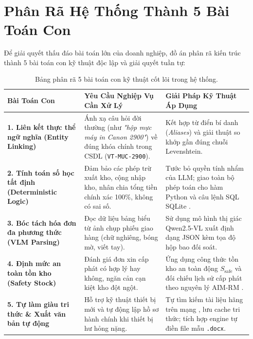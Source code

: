 \documentclass[11pt,a4paper]{article}
\begin{document}
\newpage

\section{Phân Rã Hệ Thống Thành 5 Bài Toán Con}

Để giải quyết thấu đáo bài toán lớn của doanh nghiệp, đồ án phân rã kiến trúc thành 5 bài toán con kỹ thuật độc lập và giải quyết tuần tự:

\begin{table}[H]
\centering
\small
\renewcommand{\arraystretch}{1.25}
\begin{tabularx}{\textwidth}{p{3.2cm} p{5.0cm} >{\raggedright\arraybackslash}X}
\toprule
\textbf{Bài Toán Con} & \textbf{Yêu Cầu Nghiệp Vụ Cần Xử Lý} & \textbf{Giải Pháp Kỹ Thuật Áp Dụng} \\
\midrule
\textbf{1. Liên kết thực thể ngữ nghĩa (Entity Linking)} & Ánh xạ câu hỏi đời thường (như \textit{"hộp mực máy in Canon 2900"}) về đúng khóa chính trong CSDL (\texttt{VT-MUC-2900}). & Kết hợp từ điển bí danh (\textit{Aliases}) và giải thuật so khớp gần đúng chuỗi Levenshtein. \\
\addlinespace
\textbf{2. Tính toán số học tất định (Deterministic Logic)} & Đảm bảo các phép trừ xuất kho, cộng nhập kho, nhân chia tổng tiền chính xác 100\%, không có sai số. & Tước bỏ quyền tính nhẩm của LLM; giao toàn bộ phép toán cho hàm Python và câu lệnh SQL SQLite \cite{toolformer2023}. \\
\addlinespace
\textbf{3. Bóc tách hóa đơn đa phương thức (VLM Parsing)} & Đọc dữ liệu bảng biểu từ ảnh chụp phiếu giao hàng (chữ nghiêng, bóng mờ, viết tay). & Sử dụng mô hình thị giác Qwen2.5-VL \cite{qwen25vl2026} xuất định dạng JSON kèm tọa độ hộp bao đối soát. \\
\addlinespace
\textbf{4. Định mức an toàn tồn kho (Safety Stock)} & Đánh giá đơn xin cấp phát có hợp lý hay không, ngăn cản cạn kiệt kho đột ngột. & Ứng dụng công thức tồn kho an toàn động $S_{\text{safe}}$ và đối chiếu lịch sử cấp phát theo nguyên lý AIM-RM \cite{supplychain2026}. \\
\addlinespace
\textbf{5. Tự làm giàu tri thức \& Xuất văn bản tự động} & Hỗ trợ kỹ thuật thiết bị mới và tự động lập hồ sơ hành chính khi thiết bị hư hỏng nặng. & Tự tìm kiếm tài liệu hãng trên mạng \cite{toolformer2023}, lưu cache tri thức; tích hợp engine tự điền file mẫu \texttt{.docx}. \\
\bottomrule
\end{tabularx}
\caption{Bảng phân rã 5 bài toán con kỹ thuật cốt lõi trong hệ thống.}
\end{table}
\end{document}
